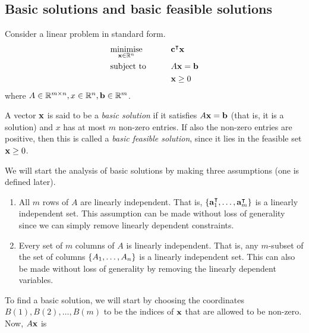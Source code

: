 \subsection{Basic solutions and basic feasible solutions}
Consider a linear problem in standard form.
\begin{alignat*}{2}
	 & \underset{\vb x \in \mathbb R^n}{\text{minimise}} & \qquad & \vb c^\intercal \vb x \\
	 & \text{subject to}                                 &        & A\vb x = \vb b         \\
	 &                                                   &        & \vb x \geq 0
\end{alignat*}
where \( A \in \mathbb R^{m \times n}, x \in \mathbb R^n, \vb b \in \mathbb R^m \).
\begin{definition}
	A vector \( \vb x \) is said to be a \textit{basic solution} if it satisfies \( A \vb x = \vb b \) (that is, it is a solution) and \( x \) has at most \( m \) non-zero entries.
	If also the non-zero entries are positive, then this is called a \textit{basic feasible solution}, since it lies in the feasible set \( \vb x \geq 0 \).
\end{definition}
\noindent We will start the analysis of basic solutions by making three assumptions (one is defined later).
\begin{enumerate}[A:]
	\item All \( m \) rows of \( A \) are linearly independent.
	      That is, \( \qty{ \vb a_1^\intercal, \dots, \vb a_m^\intercal} \) is a linearly independent set.
	      This assumption can be made without loss of generality since we can simply remove linearly dependent constraints.
	\item Every set of \( m \) columns of \( A \) is linearly independent.
	      That is, any \( m \)-subset of the set of columns \( \qty{ A_1, \dots, A_n } \) is a linearly independent set.
	      This can also be made without loss of generality by removing the linearly dependent variables.
\end{enumerate}
To find a basic solution, we will start by choosing the coordinates \( B(1), B(2), \dots, B(m) \) to be the indices of \( \vb x \) that are allowed to be non-zero.
Now, \( A \vb x \) is
